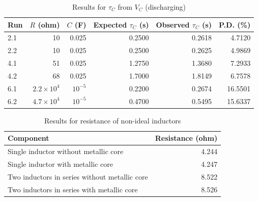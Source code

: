 \begin{table}[ht!]
    \begin{center}
        \begin{tabular}{|l|r|r|r|r|r|}
            \hline
            Run & $R$ (ohm) & $C$ (F) & Expected $\tau_{C}$ (s) & Observed $\tau_{C}$ (s) & P.D. (\%) \\
            \hline
            2.1 & 10 & 0.025 & 0.2500 & 0.2618 & 4.7120 \\
            2.2 & 10 & 0.025 & 0.2500 & 0.2625 & 4.9869 \\
            4.1 & 51 & 0.025 & 1.2750 & 1.3680 & 7.2933 \\
            4.2 & 68 & 0.025 & 1.7000 & 1.8149 & 6.7578 \\
            6.1 & $2.2 \times 10^{4}$ & $10^{-5}$ & 0.2200 & 0.2674 & 16.5501 \\
            6.2 & $4.7 \times 10^{4}$ & $10^{-5}$ & 0.4700 & 0.5495 & 15.6337 \\
            \hline
        \end{tabular}
    \end{center}
    \caption{Results for $\tau_{C}$ from $V_{C}$ (discharging)}
\end{table}
%
\begin{table}[ht!]
    \begin{center}
        \begin{tabular}{|l|r|}
            \hline
            Component & Resistance (ohm) \\
            \hline
            Single inductor without metallic core & 4.244 \\
            Single inductor with metallic core & 4.247 \\
            Two inductors in series without metallic core & 8.522 \\
            Two inductors in series with metallic core & 8.526 \\
            \hline
        \end{tabular}
    \end{center}
    \caption{Results for resistance of non-ideal inductors}
\end{table}
%
